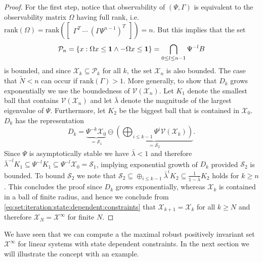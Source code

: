 \documentclass[letterpaper, 10pt, conference]{ieeeconf} %
\begin{document}
\begin{proof}
For the first step, notice that observability of
$(\Psi,\Gamma)$ is equivalent to the observability matrix $\Omega$ having full rank, i.e.\ $\mathrm{rank}(\Omega) = \mathrm{rank}(\begin{bmatrix} \Gamma^T \ \cdots \ (\Gamma\Psi^{n-1})^T\end{bmatrix}) = n$.
But  this implies that the set 
\[
\mathcal P_{n} = \{x: 
\Omega x\leq{\bf{1}}\wedge-\Omega x\leq{\bf{1}}\} = \bigcap_{0\leq l\leq n-1} \Psi^{-l} B
\]
is bounded, and since $\mathcal X_k\subseteq \mathcal P_k$ for all $k$, 
the set $\mathcal X_{n}$ is also bounded. The case that $\tilde N<n$ can occur if $\mathrm{rank}(\Gamma) > 1$.
More generally, to show that $D_k$ grows exponentially we use the boundedness of $\mathcal V(\mathcal X_{n})$. Let $K_1$ denote the smallest ball that contains $\mathcal V(\mathcal X_{n})$ and let
$\bar\lambda$ denote the magnitude of the largest eigenvalue of $\Psi$. Furthermore, let $K_2$
be the biggest ball that is contained in $\mathcal X_{0}$. $D_k$ has the representation
\begin{equation}
D_k = \underbrace{\Psi^{-k}\mathcal X_0}_{=\mathcal S_1} \ominus \underbrace{\left(\bigoplus_{i\leq k-1} 
\Psi^i\mathcal V(\mathcal X_k)\right)}_{=\mathcal S_2}.
\end{equation}
Since $\Psi$ is asymptotically stable we have $\bar\lambda<1$ and therefore
$\bar\lambda^{-l}K_1\subseteq\Psi^{-l} K_1 \subseteq \Psi^{-l}\mathcal X_0 = \mathcal S_1$,
implying exponential growth of $D_k$ provided $\mathcal S_2$ is bounded. 
To bound $\mathcal S_2$ we note that $\mathcal S_2\subseteq \oplus_{i\leq k-1} \bar\lambda^i K_2 \subseteq
\frac{1}{1-\bar\lambda} K_2$ holds for $k\geq n$. This concludes the proof since $D_k$ grows exponentially,
whereas $\mathcal X_k$ is contained in a ball of
finite radius, and hence we conclude from \eqref{eq:set:iteration:state:dependent:constraints} that 
$\mathcal X_{k+1} = \mathcal X _k$ for all $k\geq N$ and therefore $\mathcal X _N = \mathcal X^\infty$ for finite $N$.
\end{proof}
%
We have seen that we can compute a the maximal robust positively invariant set $\mathcal X^\infty$ for linear 
systems with state dependent constraints. In the next section we will illustrate the concept with an 
example.
%
%
%
\end{document}
